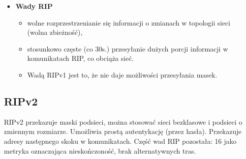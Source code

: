 \documentclass[../main.tex]{subfiles}
\begin{document}
\begin{itemize}
        \item \textbf{Wady RIP}
        \begin{itemize}
            \item wolne rozprzestrzenianie się informacji o zmianach w topologii sieci (wolna zbieżność),
            \item stosunkowo częste (co 30s.) przesyłanie dużych porcji informacji w komunikatach RIP, co obciąża sieć.
            \item Wadą RIPv1 jest to, że nie daje możliwości przesyłania masek.
        \end{itemize}
    \end{itemize}

    \subsection{RIPv2}
    RIPv2 przekazuje maski podsieci, można stosować sieci bezklasowe i podsieci o zmiennym rozmiarze.
    Umożliwia prostą autentykację (przez hasła).
    Przekazuje adresy następnego skoku w komunikatach.
    Część wad RIP pozostała: 16 jako metryka oznaczająca nieskończoność, brak alternatywnych tras.
\end{document}
